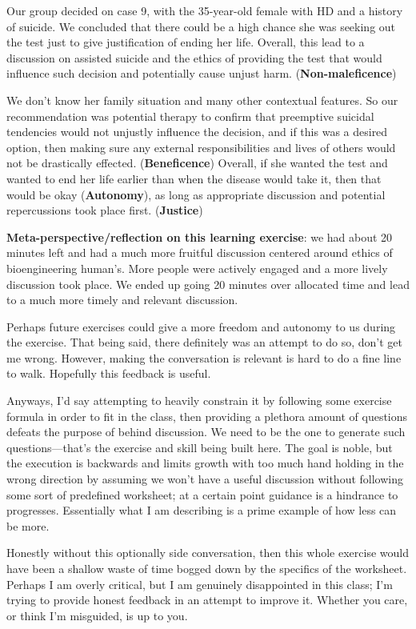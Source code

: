 \documentclass[plain,basic]{inVerba-notes}
\begin{document}
Our group decided on case 9, with the 35-year-old female with HD and a history of suicide. We concluded that there could be a high chance she was seeking out the test just to give justification of ending her life. Overall, this lead to a discussion on assisted suicide and the ethics of providing the test that would influence such decision and potentially cause unjust harm. (\textbf{Non-maleficence})

We don't know her family situation and many other contextual features. So our recommendation was potential therapy to confirm that preemptive suicidal tendencies would not unjustly influence the decision, and if this was a desired option, then making sure any external responsibilities and lives of others would not be drastically effected. (\textbf{Beneficence}) Overall, if she wanted the test and wanted to end her life earlier than when the disease would take it, then that would be okay (\textbf{Autonomy}), as long as appropriate discussion and potential repercussions took place first. (\textbf{Justice})

\textbf{Meta-perspective/reflection on this learning exercise}: we had about 20 minutes left and had a much more fruitful discussion centered around ethics of bioengineering human's. More people were actively engaged and a more lively discussion took place. We ended up going 20 minutes over allocated time and lead to a much more timely and relevant discussion. 

Perhaps future exercises could give a more freedom and autonomy to us during the exercise. That being said, there definitely was an attempt to do so, don't get me wrong. However, making the conversation is relevant is hard to do a fine line to walk. Hopefully this feedback is useful.

Anyways, I'd say attempting to heavily constrain it by following some exercise formula in order to fit in the class, then providing a plethora amount of questions defeats the purpose of behind discussion. We need to be the one to generate such questions---that's the exercise and skill being built here. The goal is noble, but the execution is backwards and limits growth with too much hand holding in the wrong direction by assuming we won't have a useful discussion without following some sort of predefined worksheet; at a certain point guidance is a hindrance to progresses. Essentially what I am describing is a prime example of how less can be more. 

Honestly without this optionally side conversation, then this whole exercise would have been a shallow waste of time bogged down by the specifics of the worksheet. Perhaps I am overly critical, but I am genuinely disappointed in this class; I'm trying to provide honest feedback in an attempt to improve it. Whether you care, or think I'm misguided, is up to you. 
\end{document}
